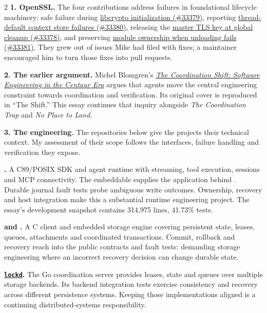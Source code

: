\begingroup
\small
\begin{multicols}{2}
\noindent\hypertarget{note1}{\textbf{1. OpenSSL.}}
The four contributions address failures in foundational lifecycle machinery: safe failure during \href{https://github.com/openssl/openssl/pull/33379}{libcrypto initialization (\#33379)}, reporting \href{https://github.com/openssl/openssl/pull/33380}{thread-default context store failures (\#33380)}, releasing the \href{https://github.com/openssl/openssl/pull/33378}{master TLS key at global cleanup (\#33378)}, and preserving \href{https://github.com/openssl/openssl/pull/33381}{module ownership when unloading fails (\#33381)}. They grew out of issues Mike had filed with fixes; a maintainer encouraged him to turn those fixes into pull requests.

\medskip
\noindent\hypertarget{note2}{\textbf{2. The earlier argument.}}
Michel Blomgren's \href{https://c89.systems/10x.pdf}{\emph{The Coordination Shift: Software Engineering in the Centaur Era}} argues that agents move the central engineering constraint towards coordination and verification. Its original cover is reproduced in ``The Shift.'' This essay continues that inquiry alongside \emph{The Coordination Trap} and \emph{No Place to Land}.

\medskip
\noindent\hypertarget{note3}{\textbf{3. The engineering.}}
The repositories below give the projects their technical context. My assessment of their scope follows the interfaces, failure handling and verification they expose.

\medskip
\noindent\textbf{.}
A C89/POSIX SDK and agent runtime with streaming, tool execution, sessions and MCP connectivity. The embeddable  supplies the application behind . Durable journal fault tests probe ambiguous write outcomes. Ownership, recovery and host integration make this a substantial runtime engineering project. The essay's development snapshot contains 314,975 lines, 41.73\% tests.

\medskip
\noindent\textbf{ and .}
A C client and embedded storage engine covering persistent state, leases, queues, attachments and coordinated transactions. Commit, rollback and recovery reach into the public contracts and fault tests: demanding storage engineering where an incorrect recovery decision can change durable state.

\medskip
\noindent\textbf{\href{https://github.com/sa6mwa/lockd}{\texttt{lockd}}.}
The Go coordination server provides leases, state and queues over multiple storage backends. Its backend integration tests exercise consistency and recovery across different persistence systems. Keeping those implementations aligned is a continuing distributed-systems responsibility.


\end{multicols}
